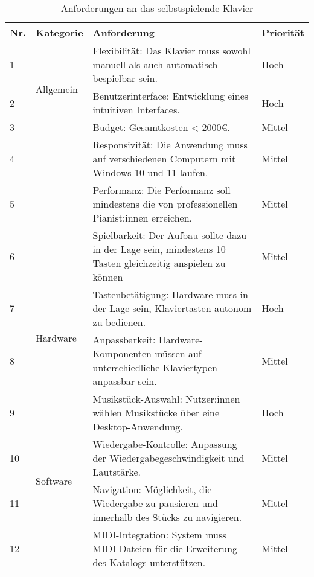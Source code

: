 \begin{table}[ht]
    \centering
    \begin{tabular}{ | m{1cm} | m{2cm} | m{8cm} | m{2cm} | }
        \hline
        \textbf{Nr.} & \textbf{Kategorie} & \textbf{Anforderung} & \textbf{Priorität} \\
        \hline
        1 & \multirow{3}{2cm}{Allgemein} & Flexibilität: Das Klavier muss sowohl manuell als auch automatisch bespielbar sein. & Hoch \\
        \cline{1-1} \cline{3-4}
        2 & & Benutzerinterface: Entwicklung eines intuitiven Interfaces. & Hoch \\
        \cline{1-1} \cline{3-4}
        3 & & Budget: Gesamtkosten < 2000€. & Mittel \\
        \cline{1-1} \cline{3-4}
        4 & & Responsivität: Die Anwendung muss auf verschiedenen Computern mit Windows 10 und 11 laufen. & Mittel \\
        \cline{1-1} \cline{3-4}
        5 & & Performanz: Die Performanz soll mindestens die von professionellen Pianist:innen erreichen. & Mittel \\
        \cline{1-1} \cline{3-4}%
        6 & & Spielbarkeit: Der Aufbau sollte dazu in der Lage sein, mindestens 10 Tasten gleichzeitig anspielen zu können & Mittel \\
        \hline
        7 & \multirow{2}{2cm}{Hardware} & Tastenbetätigung: Hardware muss in der Lage sein, Klaviertasten autonom zu bedienen. & Hoch \\
        \cline{1-1} \cline{3-4}
        8 & & Anpassbarkeit: Hardware-Komponenten müssen auf unterschiedliche Klaviertypen anpassbar sein. & Mittel \\
        \hline
        9 & \multirow{4}{2cm}{Software} & Musikstück-Auswahl: Nutzer:innen wählen Musikstücke über eine Desktop-Anwendung. & Hoch \\
        \cline{1-1} \cline{3-4}
        10 & & Wiedergabe-Kontrolle: Anpassung der Wiedergabegeschwindigkeit und Lautstärke. & Mittel \\
        \cline{1-1} \cline{3-4}
        11 & & Navigation: Möglichkeit, die Wiedergabe zu pausieren und innerhalb des Stücks zu navigieren. & Mittel \\
        \cline{1-1} \cline{3-4}
        12 & & MIDI-Integration: System muss MIDI-Dateien für die Erweiterung des Katalogs unterstützen. & Mittel \\
        \hline
    \end{tabular}
    \caption{Anforderungen an das selbstspielende Klavier}
    \label{table:anforderungen}
\end{table}



